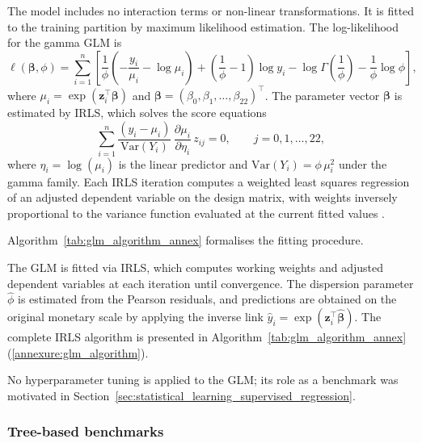 The model includes no interaction terms or non-linear transformations.  It
is fitted to the training partition by maximum likelihood estimation.  The
log-likelihood for the gamma GLM is
\begin{equation}
    \ell(\boldsymbol{\beta}, \phi)
    =
    \sum_{i=1}^{n}
    \left[
        \frac{1}{\phi}
        \left(
            -\frac{y_i}{\mu_i} - \log \mu_i
        \right)
        +
        \left(\frac{1}{\phi} - 1\right) \log y_i
        -
        \log \Gamma\!\left(\frac{1}{\phi}\right)
        -
        \frac{1}{\phi}\log \phi
    \right],
    \label{eq:glm_loglikelihood}
\end{equation}
where $\mu_i = \exp(\mathbf{z}_i^{\top}\boldsymbol{\beta})$ and
$\boldsymbol{\beta} = (\beta_0, \beta_1, \ldots, \beta_{22})^{\top}$.
The parameter vector $\boldsymbol{\beta}$ is estimated by IRLS, which solves the score equations
\begin{equation}
    \sum_{i=1}^{n}
    \frac{(y_i - \mu_i)}{\mathrm{Var}(Y_i)}
    \,
    \frac{\partial \mu_i}{\partial \eta_i}
    \,
    z_{ij}
    = 0,
    \qquad j = 0, 1, \ldots, 22,
    \label{eq:glm_score}
\end{equation}
where $\eta_i = \log(\mu_i)$ is the linear predictor and
$\mathrm{Var}(Y_i) = \phi\,\mu_i^{2}$ under the gamma family.  Each IRLS
iteration computes a weighted least squares regression of an adjusted
dependent variable on the design matrix, with weights inversely
proportional to the variance function evaluated at the current fitted
values \citep{dobson2008introduction}.

Algorithm~\ref{tab:glm_algorithm_annex} formalises the fitting procedure.

The GLM is fitted via IRLS,
which computes working weights and adjusted dependent variables at each
iteration until convergence.  The dispersion parameter
$\widehat{\phi}$ is estimated from the Pearson residuals, and
predictions are obtained on the original monetary scale by applying the
inverse link $\widehat{y}_i = \exp(\mathbf{z}_i^{\top}
\widehat{\boldsymbol{\beta}})$.  The complete IRLS algorithm is
presented in Algorithm~\ref{tab:glm_algorithm_annex}
(\ref{annexure:glm_algorithm}).

No hyperparameter tuning is applied to the GLM; its role as a benchmark
was motivated in Section~\ref{sec:statistical_learning_supervised_regression}.

\subsubsection{Tree-based benchmarks}
\label{sec:tree_benchmarks_methods}


